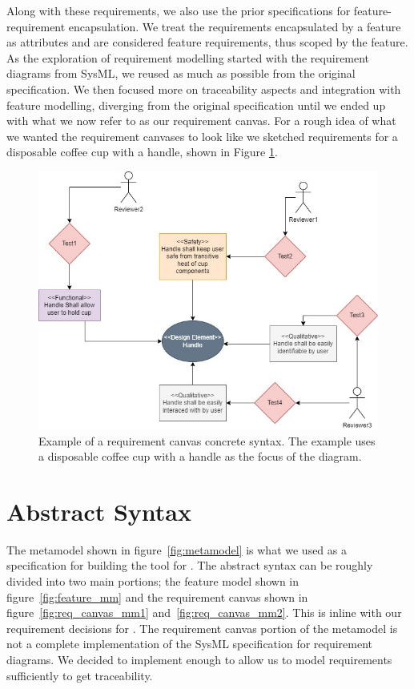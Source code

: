 Along with these requirements, we also use the prior specifications for feature-requirement encapsulation. We treat the requirements encapsulated by a feature as attributes and are considered feature requirements, thus scoped by the feature. As the exploration of requirement modelling started with the requirement diagrams from SysML, we reused as much as possible from the original specification. We then focused more on traceability aspects and integration with feature modelling, diverging from the original specification until we ended up with what we now refer to as our requirement canvas. For a rough idea of what we wanted the requirement canvases to look like we sketched requirements for a disposable coffee cup with a handle, shown in Figure \ref{fig:CoffeCup_ReqModel}.

\begin{figure}[hbt!]
	\centering
	\includegraphics[width=\columnwidth]{Figures/CoffeCup_ReqModel.jpg}
	\caption{Example of a requirement canvas concrete syntax. The example uses a disposable coffee cup with a handle as the focus of the diagram.}
	\label{fig:CoffeCup_ReqModel}
\end{figure}

\section{Abstract Syntax}
\label{sec:Abstract_Syntax}

The metamodel shown in figure~\ref{fig:metamodel} is what we used as a specification for building the tool for \tool. The abstract syntax can be roughly divided into two main portions; the feature model shown in figure~\ref{fig:feature_mm} and the requirement canvas shown in figure~\ref{fig:req_canvas_mm1} and~\ref{fig:req_canvas_mm2}. This is inline with our requirement decisions for \tool. The requirement canvas portion of the metamodel is not a complete implementation of the SysML specification for requirement diagrams. We decided to implement enough to allow us to model requirements sufficiently to get traceability. 

